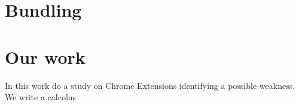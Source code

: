 
\section{Bundling}
\label{sec:Bundling}

\section{Our work} 
\label{sec:OurWork}
In this work do a study on Chrome Extensions identifying a possible weakness. We write a calcolus 
